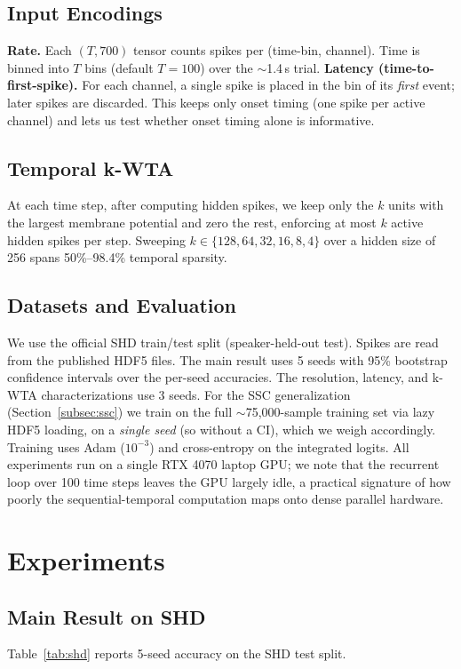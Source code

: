 \documentclass[11pt]{article}
\begin{document}
\subsection{Input Encodings}
\textbf{Rate.} Each $(T,700)$ tensor counts spikes per (time-bin, channel). Time is binned into $T$ bins (default $T=100$) over the $\sim$1.4\,s trial.
\textbf{Latency (time-to-first-spike).} For each channel, a single spike is placed in the bin of its \emph{first} event; later spikes are discarded. This keeps only onset timing (one spike per active channel) and lets us test whether onset timing alone is informative.

\subsection{Temporal k-WTA}
At each time step, after computing hidden spikes, we keep only the $k$ units with the largest membrane potential and zero the rest, enforcing at most $k$ active hidden spikes per step. Sweeping $k \in \{128, 64, 32, 16, 8, 4\}$ over a hidden size of 256 spans 50\%--98.4\% temporal sparsity.

\subsection{Datasets and Evaluation}
We use the official SHD train/test split (speaker-held-out test). Spikes are read from the published HDF5 files. The main result uses 5 seeds with 95\% bootstrap confidence intervals over the per-seed accuracies. The resolution, latency, and k-WTA characterizations use 3 seeds. For the SSC generalization (Section~\ref{subsec:ssc}) we train on the full $\sim$75{,}000-sample training set via lazy HDF5 loading, on a \emph{single seed} (so without a CI), which we weigh accordingly. Training uses Adam ($10^{-3}$) and cross-entropy on the integrated logits. All experiments run on a single RTX 4070 laptop GPU; we note that the recurrent loop over 100 time steps leaves the GPU largely idle, a practical signature of how poorly the sequential-temporal computation maps onto dense parallel hardware.

\section{Experiments}
\label{sec:experiments}

\subsection{Main Result on SHD}
\label{subsec:main}
Table~\ref{tab:shd} reports 5-seed accuracy on the SHD test split.
\end{document}
